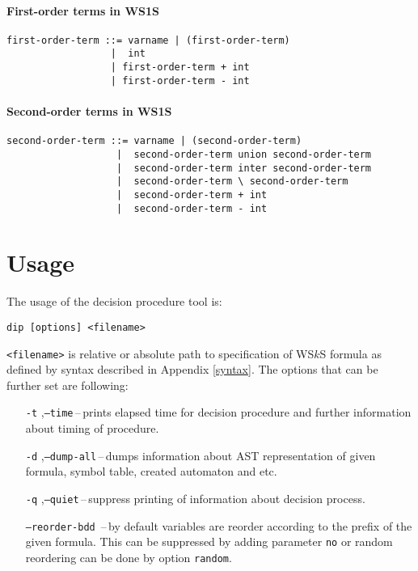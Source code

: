 \subsubsection{First-order terms in WS1S}
\begin{verbatim}
first-order-term ::= varname | (first-order-term)
                  |  int
                  | first-order-term + int
                  | first-order-term - int
\end{verbatim}

\subsubsection{Second-order terms in WS1S}
\begin{verbatim}
second-order-term ::= varname | (second-order-term)
                   |  second-order-term union second-order-term
                   |  second-order-term inter second-order-term
                   |  second-order-term \ second-order-term
                   |  second-order-term + int
                   |  second-order-term - int
\end{verbatim}

\chapter{Usage}
The usage of the decision procedure tool is:
\begin{center}
 \texttt{dip [options] <filename>}
\end{center}
\texttt{<filename>} is relative or absolute path to specification of WS$k$S
formula as defined by syntax described in Appendix \ref{syntax}. The options
that can be further set are following:
\begin{itemize}
  \item[\texttt{-t}],\texttt{--time}\,--\,prints elapsed time for decision
  procedure and further information about timing of procedure.
  \item[\texttt{-d}],\texttt{--dump-all}\,--\,dumps information about AST
  representation of given formula, symbol table, created automaton and etc.
  \item[\texttt{-q}],\texttt{--quiet}\,--\,suppress printing of information
  about decision process.
  \item[\texttt{--reorder-bdd}]\,--\,by default variables are reorder according
  to the prefix of the given formula. This can be suppressed by adding parameter
  \texttt{no} or random reordering can be done by option \texttt{random}.
\end{itemize}

